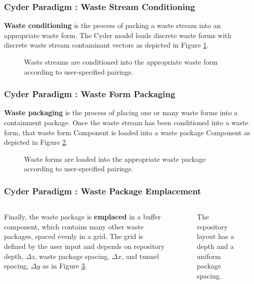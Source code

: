 \begin{frame}[ctb!]
  \frametitle{Cyder Paradigm : Waste Stream Conditioning}
  \footnotesize{

    \textbf{Waste conditioning} is the process of packing a waste stream into an appropriate 
waste form.  The Cyder model loads discrete waste forms with discrete waste 
stream contaminant vectors as depicted in Figure \ref{fig:ws_conditioning}.
  
\begin{figure}[htbp!]
\begin{center}
\def\svgwidth{.5\textwidth}

\end{center}
\caption{Waste streams are conditioned into the appropriate waste form 
according to user-specified pairings.}
\label{fig:ws_conditioning}
\end{figure}
}
\end{frame}

\begin{frame}[ctb!]
  \frametitle{Cyder Paradigm : Waste Form Packaging}
  \footnotesize{

    \textbf{Waste packaging} is the process of placing one or many waste forms into a 
containment package. Once the waste stream has been conditioned into a waste 
form, that waste form Component is loaded into a waste package Component as 
depicted in Figure \ref{fig:wf_packaging}.  

\begin{figure}[htbp!]
\begin{center}
\def\svgwidth{.5\textwidth}

\end{center}
\caption{Waste forms are loaded into the appropriate waste package 
according to user-specified pairings.}
\label{fig:wf_packaging}
\end{figure}
}
\end{frame}

\begin{frame}[ctb!]
  \frametitle{Cyder Paradigm : Waste Package Emplacement}
\footnotesize{
  \begin{columns}[c]
Finally, the waste package is \textbf{emplaced} in a buffer component, which 
contains many other waste packages, spaced evenly in a grid. The grid is 
defined by the user input and depends on repository depth, $\Delta z$, waste 
package spacing, $\Delta x$, and tunnel spacing, $\Delta y$ as in Figure 
\ref{fig:repo_layout}.

\begin{figure}[htbp!]
\begin{center}
\def\svgwidth{.5\textwidth}

\end{center}
\caption{The repository layout has a depth and a uniform package spacing.}
\label{fig:repo_layout}
\end{figure}
\end{columns}
  }
\end{frame}


